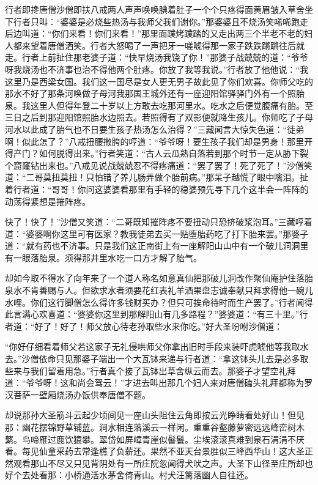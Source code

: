 \documentclass[12pt,UTF8]{ctexbook}
\begin{document}
{行者即搀唐僧沙僧即扶八戒两人声声唤唤腆着肚子一个个只疼得面黄眉皱入草舍坐下行者只叫：“婆婆是必烧些热汤与我师父我们谢你。”那婆婆且不烧汤笑唏唏跑走后边叫道：“你们来看！你们来看！”那里面蹼烤蹼踏的又走出两三个半老不老的妇人都来望着唐僧洒笑。行者大怒喝了一声把牙一嗟唬得那一家子跌跌蹡蹡往后就走。行者上前扯住那老婆子道：“快早烧汤我饶了你！”那婆子战兢兢的道：“爷爷呀我烧汤也不济事也治不得他两个肚疼。你放了我等我说。”行者放了他他说：“我这里乃是西梁女国。我们这一国尽是女人更无男子故此见了你们欢喜。你师父吃的那水不好了那条河唤做子母河我那国王城外还有一座迎阳馆驿驿门外有一个照胎泉。我这里人但得年登二十岁以上方敢去吃那河里水。吃水之后便觉腹痛有胎。至三日之后到那迎阳馆照胎水边照去。若照得有了双影便就降生孩儿。你师吃了子母河水以此成了胎气也不日要生孩子热汤怎么治得？”三藏闻言大惊失色道：“徒弟啊！似此怎了？”八戒扭腰撒胯的哼道：“爷爷呀！要生孩子我们却是男身！那里开得产门？如何脱得出来。”行者笑道：“古人云瓜熟自落若到那个时节一定从胁下裂个窟窿钻出来也。”八戒见说战兢兢忍不得疼痛道：“罢了罢了！死了死了！”沙僧笑道：“二哥莫扭莫扭！只怕错了养儿肠弄做个胎前病。”那呆子越慌了眼中噙泪。扯着行者道：“哥哥！你问这婆婆看那里有手轻的稳婆预先寻下几个这半会一阵阵的动荡得紧想是摧阵疼。

快了！快了！”沙僧又笑道：“二哥既知摧阵疼不要扭动只恐挤破浆泡耳。”三藏哼着道：“婆婆啊你这里可有医家？教我徒弟去买一贴堕胎药吃了打下胎来罢。”那婆子道：“就有药也不济事。只是我们这正南街上有一座解阳山山中有一个破儿洞洞里有一眼落胎泉。须得那井里水吃一口方才解了胎气。

却如今取不得水了向年来了一个道人称名如意真仙把那破儿洞改作聚仙庵护住落胎泉水不肯善赐与人。但欲求水者须要花红表礼羊酒果盘志诚奉献只拜求得他一碗儿水哩。你们这行脚僧怎么得许多钱财买办？但只可挨命待时而生产罢了。”行者闻得此言满心欢喜道：“婆婆你这里到那解阳山有几多路程？”婆婆道：“有三十里。”行者道：“好了！好了！师父放心待老孙取些水来你吃。”好大圣吩咐沙僧道：

“你好仔细看着师父若这家子无礼侵哄师父你拿出旧时手段来装吓虎唬他等我取水去。”沙僧依命只见那婆子端出一个大瓦钵来递与行者道：“拿这钵头儿去是必多取些来与我们留着用急。”行者真个接了瓦钵出草舍纵云而去。那婆子才望空礼拜道：“爷爷呀！这和尚会驾云！”才进去叫出那几个妇人来对唐僧磕头礼拜都称为罗汉菩萨一壁厢烧汤办饭供奉唐僧不题。

却说那孙大圣筋斗云起少顷间见一座山头阻住云角即按云光睁睛看处好山！但见那：幽花摆锦野草铺蓝。涧水相连落溪云一样闲。重重谷壑藤萝密远远峰峦树木蘩。鸟啼雁过鹿饮猿攀。翠岱如屏嶂青崖似髻鬟。尘埃滚滚真难到泉石涓涓不厌看。每见仙童采药去常逢樵了负薪还。果然不亚天台景胜似三峰西华山！这大圣正然观看那山不尽又只见背阴处有一所庄院忽闻得犬吠之声。大圣下山径至庄所却也好个去处看那：小桥通活水茅舍倚青山。村犬汪篱落幽人自往还。

}
\end{document}
